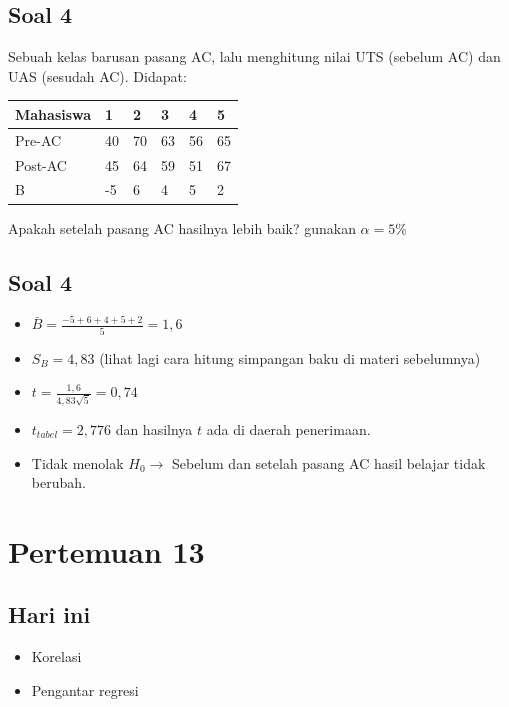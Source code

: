 \documentclass[
  letterpaper,
  DIV=11,
  numbers=noendperiod]{scrartcl}
\begin{document}
\subsection{Soal 4}\label{soal-4}

Sebuah kelas barusan pasang AC, lalu menghitung nilai UTS (sebelum AC)
dan UAS (sesudah AC). Didapat:

\begin{longtable}[]{@{}llllll@{}}
\toprule\noalign{}
Mahasiswa & 1 & 2 & 3 & 4 & 5 \\
\midrule\noalign{}
\endhead
\bottomrule\noalign{}
\endlastfoot
Pre-AC & 40 & 70 & 63 & 56 & 65 \\
Post-AC & 45 & 64 & 59 & 51 & 67 \\
B & -5 & 6 & 4 & 5 & 2 \\
\end{longtable}

Apakah setelah pasang AC hasilnya lebih baik? gunakan \(\alpha=5\%\)

\subsection{Soal 4}\label{soal-4-1}

\begin{itemize}
\item
  \(\bar{B}=\frac{-5+6+4+5+2}{5}=1,6\)
\item
  \(S_B=4,83\) (lihat lagi cara hitung simpangan baku di materi
  sebelumnya)
\item
  \(t=\frac{1,6}{4,83\sqrt{5}}=0,74\)
\item
  \(t_{tabel}=2,776\) dan hasilnya \(t\) ada di daerah penerimaan.
\item
  Tidak menolak \(H_0 \rightarrow\) Sebelum dan setelah pasang AC hasil
  belajar tidak berubah.
\end{itemize}

\section{Pertemuan 13}\label{pertemuan-13}

\subsection{Hari ini}\label{hari-ini-3}

\begin{itemize}
\item
  Korelasi
\item
  Pengantar regresi
\end{itemize}
\end{document}
